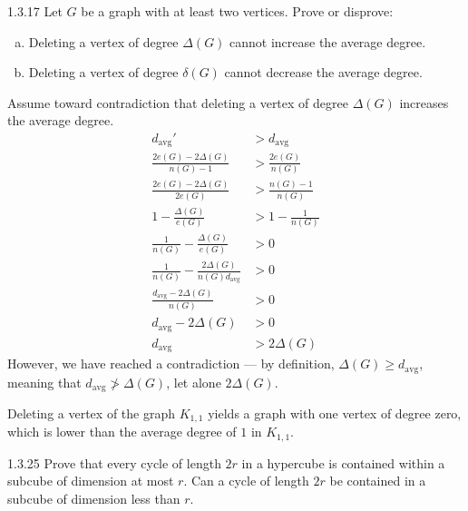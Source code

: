 \documentclass[9pt]{extarticle}
\title{}
\author{Avinash Iyer}
\date{}
\begin{document}
  \begin{problem}{1.3.17}
    Let $G$ be a graph with at least two vertices. Prove or disprove:
    \begin{enumerate}[(a)]
      \item Deleting a vertex of degree $\Delta(G)$ cannot increase the average degree.
      \item Deleting a vertex of degree $\delta(G)$ cannot decrease the average degree.
    \end{enumerate}
  \end{problem}
  \begin{solution}
    \begin{tcolorbox}[colback = white, title = (a), breakable]
      Assume toward contradiction that deleting a vertex of degree $\Delta(G)$ increases the average degree.
      \begin{align*}
        d_{\textrm{avg}}' &> d_{\textrm{avg}} \\
        \frac{2e(G) - 2\Delta(G)}{n(G) - 1} &> \frac{2e(G)}{n(G)}\\
        \frac{2e(G) - 2\Delta(G)}{2e(G)} &> \frac{n(G) - 1}{n(G)}\\
        1 - \frac{\Delta(G)}{e(G)} &> 1 - \frac{1}{n(G)}\\
        \frac{1}{n(G)} - \frac{\Delta(G)}{e(G)} &> 0 \\
        \frac{1}{n(G)} - \frac{2\Delta(G)}{n(G)d_{\textrm{avg}}} &> 0 \\
        \frac{d_{\textrm{avg}} - 2\Delta(G)}{n(G)} &> 0\\
        d_{\textrm{avg}} - 2\Delta(G) &> 0\\
        d_{\textrm{avg}} &> 2\Delta(G)
      \end{align*}
      However, we have reached a contradiction --- by definition, $\Delta(G) \geq d_{\textrm{avg}}$, meaning that $d_{\textrm{avg}}\not> \Delta(G)$, let alone $2\Delta(G)$.
    \end{tcolorbox}
    \begin{tcolorbox}[colback = white, title = (b), breakable]
      Deleting a vertex of the graph $K_{1,1}$ yields a graph with one vertex of degree zero, which is lower than the average degree of $1$ in $K_{1,1}$.
    \end{tcolorbox}
  \end{solution}
  \begin{problem}{1.3.25}
    Prove that every cycle of length $2r$ in a hypercube is contained within a subcube of dimension at most $r$. Can a cycle of length $2r$ be contained in a subcube of dimension less than $r$.
  \end{problem}
\end{document}
